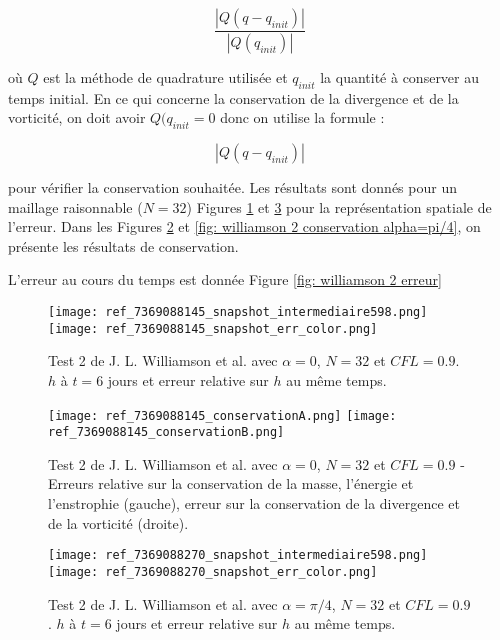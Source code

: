 \begin{equation}
\dfrac{|Q(q - q_{init})|}{|Q(q_{init})|}
\end{equation}

où $Q$ est la méthode de quadrature utilisée et $q_{init}$ la quantité à conserver au temps initial. En ce qui concerne la conservation de la divergence et de la vorticité, on doit avoir $Q(q_{init}=0$ donc on utilise la formule :

\begin{equation}
|Q(q - q_{init})|
\end{equation}

pour vérifier la conservation souhaitée. Les résultats sont donnés pour un maillage raisonnable ($N=32$)  Figures \ref{fig: williamson 2 space alpha=0} et \ref{fig: williamson 2 space alpha=pi/4} pour la représentation spatiale de l'erreur. Dans les Figures \ref{fig: williamson 2 conservation alpha=0} et \ref{fig: williamson 2 conservation alpha=pi/4}, on présente les résultats de conservation.

L'erreur au cours du temps est donnée Figure \ref{fig: williamson 2 erreur}

\begin{figure}
\begin{center}
\texttt{[image: ref\_7369088145\_snapshot\_intermediaire598.png]}\\
\texttt{[image: ref\_7369088145\_snapshot\_err\_color.png]}
\end{center}
\caption{Test 2 de J. L. Williamson et al. \cite{Williamson1992} avec $\alpha=0$, $N=32$ et $CFL=0.9$. $h$ à $t=6$ jours et erreur relative sur $h$ au même temps.}
\label{fig: williamson 2 space alpha=0}
\end{figure}

\begin{figure}
\begin{center}
\texttt{[image: ref\_7369088145\_conservationA.png]}
\texttt{[image: ref\_7369088145\_conservationB.png]}
\end{center}
\caption{Test 2 de J. L. Williamson et al. \cite{Williamson1992} avec $\alpha=0$, $N=32$ et $CFL=0.9$ - Erreurs relative sur la conservation de la masse, l'énergie et l'enstrophie (gauche), erreur sur la conservation de la divergence et de la vorticité (droite).}
\label{fig: williamson 2 conservation alpha=0}
\end{figure}




\begin{figure}
\begin{center}
\texttt{[image: ref\_7369088270\_snapshot\_intermediaire598.png]}\\
\texttt{[image: ref\_7369088270\_snapshot\_err\_color.png]}
\end{center}
\caption{Test 2 de J. L. Williamson et al. \cite{Williamson1992} avec $\alpha=\pi/4$, $N=32$ et $CFL=0.9$. $h$ à $t=6$ jours et erreur relative sur $h$ au même temps.}
\label{fig: williamson 2 space alpha=pi/4}
\end{figure}

